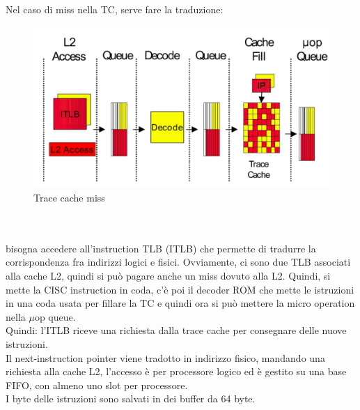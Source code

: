 \documentclass[12pt, oneside]{extbook} %
\begin{document}
Nel caso di miss nella TC, serve fare la traduzione:\\
\begin{figure}
	\includegraphics[scale=0.3]{immagini/trace_cache_miss.png}
	\caption{Trace cache miss}
\end{figure}
\\\\
bisogna accedere all'instruction TLB (ITLB) che permette di tradurre la corrispondenza fra indirizzi logici e fisici. Ovviamente, ci sono due TLB associati alla cache L2, quindi si può pagare anche un miss dovuto alla L2. Quindi, si mette la CISC instruction in coda, c'è poi il decoder ROM che mette le istruzioni in una coda usata per fillare la TC e quindi ora si può mettere la micro operation nella $\mu$op queue.\\Quindi: l'ITLB riceve una richiesta dalla trace cache per consegnare delle nuove istruzioni.\\Il next-instruction pointer viene tradotto in indirizzo fisico, mandando una richiesta alla cache L2, l'accesso è per processore logico ed è gestito su una base FIFO, con almeno uno slot per processore.\\I byte delle istruzioni sono salvati in dei buffer da 64 byte.
\end{document}
